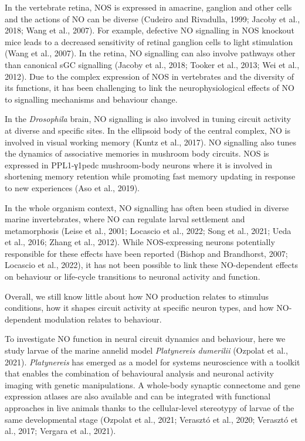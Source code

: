 \documentclass[
  10pt,
  onecolumn]{article}
\begin{document}
In the vertebrate retina, NOS is expressed in amacrine, ganglion and
other cells and the actions of NO can be diverse (Cudeiro and Rivadulla,
1999; Jacoby et al., 2018; Wang et al., 2007). For example, defective NO
signalling in NOS knockout mice leads to a decreased sensitivity of
retinal ganglion cells to light stimulation (Wang et al., 2007). In the
retina, NO signalling can also involve pathways other than canonical sGC
signalling (Jacoby et al., 2018; Tooker et al., 2013; Wei et al., 2012).
Due to the complex expression of NOS in vertebrates and the diversity of
its functions, it has been challenging to link the neurophysiological
effects of NO to signalling mechanisms and behaviour change.

In the \emph{Drosophila} brain, NO signalling is also involved in tuning
circuit activity at diverse and specific sites. In the ellipsoid body of
the central complex, NO is involved in visual working memory (Kuntz et
al., 2017). NO signalling also tunes the dynamics of associative
memories in mushroom body circuits. NOS is expressed in PPL1-γ1pedc
mushroom-body neurons where it is involved in shortening memory
retention while promoting fast memory updating in response to new
experiences (Aso et al., 2019).

In the whole organism context, NO signalling has often been studied in
diverse marine invertebrates, where NO can regulate larval settlement
and metamorphosis (Leise et al., 2001; Locascio et al., 2022; Song et
al., 2021; Ueda et al., 2016; Zhang et al., 2012). While NOS-expressing
neurons potentially responsible for these effects have been reported
(Bishop and Brandhorst, 2007; Locascio et al., 2022), it has not been
possible to link these NO-dependent effects on behaviour or life-cycle
transitions to neuronal activity and function.

Overall, we still know little about how NO production relates to
stimulus conditions, how it shapes circuit activity at specific neuron
types, and how NO-dependent modulation relates to behaviour.

To investigate NO function in neural circuit dynamics and behaviour,
here we study larvae of the marine annelid model \emph{Platynereis
dumerilii} (Ozpolat et al., 2021). \emph{Platynereis} has emerged as a
model for systems neuroscience with a toolkit that enables the
combination of behavioural analysis and neuronal activity imaging with
genetic manipulations. A whole-body synaptic connectome and gene
expression atlases are also available and can be integrated with
functional approaches in live animals thanks to the cellular-level
stereotypy of larvae of the same developmental stage (Ozpolat et al.,
2021; Verasztó et al., 2020; Verasztó et al., 2017; Vergara et al.,
2021).
\end{document}
